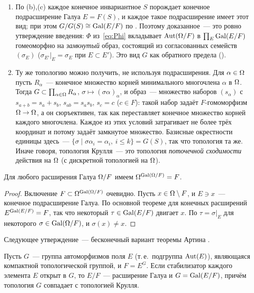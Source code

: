 \begin{remark}[7.8a]
\begin{enumerate}[label=(\alph*),leftmargin=*]
\item По (b),(c) каждое конечное инвариантное $S$ порождает конечное подрасширение Галуа $E=F(S)$, и каждое такое
подрасширение имеет этот вид; при этом $G/G(S)\cong\operatorname{Gal}(E/F)$ по . Поэтому доказанное~--- это ровно утверждение введения: $\Phi$
из~\eqref{eq:Phi} вкладывает $\operatorname{Aut}(\Omega/F)$ в $\prod_E\operatorname{Gal}(E/F)$ гомеоморфно на \emph{замкнутый} образ, состоящий из
согласованных семейств $(\sigma_E)$ ($\sigma_{E'}|_E=\sigma_E$ при $E\subset E'$). Это вид $G$ как обратного предела ().
\item Ту же топологию можно получить, не используя подрасширения. Для $\alpha\in\Omega$ пусть $R_\alpha$~--- конечное
множество корней минимального многочлена $\alpha$ в $\Omega$. Тогда $G\subset\prod_{\alpha\in\Omega}R_\alpha$,
$\sigma\mapsto(\sigma\alpha)_\alpha$, и образ~--- множество наборов $(s_\alpha)$ с $s_{a+b}=s_a+s_b$, $s_{ab}=s_as_b$,
$s_c=c$ ($c\in F$): такой набор задаёт $F$-гомоморфизм $\Omega\to\Omega$, а он сюръективен, так как переставляет конечное
множество корней каждого многочлена. Каждое из этих условий затрагивает не более трёх координат и потому задаёт
замкнутое множество. Базисные окрестности единицы здесь~--- $\{\sigma\mid\sigma\alpha_i=\alpha_i,\ i\le k\}=G(S)$, так что
топология та же. Иначе говоря, топология Крулля~--- это топология \emph{поточечной сходимости} действия на $\Omega$ (с
дискретной топологией на $\Omega$).
\end{enumerate}
\end{remark}

\begin{proposition}[7.9]
Для любого расширения Галуа $\Omega/F$ имеем $\Omega^{\operatorname{Gal}(\Omega/F)}=F$.
\end{proposition}

\begin{proof}
Включение $F\subset\Omega^{\operatorname{Gal}(\Omega/F)}$ очевидно. Пусть $x\in\Omega\setminus F$, и $E\ni x$~--- конечное подрасширение Галуа.
По основной теореме для конечных расширений $E^{\operatorname{Gal}(E/F)}=F$, так что некоторый $\tau\in\operatorname{Gal}(E/F)$ двигает $x$. По 
$\tau=\sigma|_E$ для некоторого $\sigma\in\operatorname{Gal}(\Omega/F)$, и $\sigma(x)\ne x$.
\end{proof}

Следующее утверждение~--- бесконечный вариант теоремы Артина .

\begin{proposition}[7.10]
Пусть $G$~--- группа автоморфизмов поля $E$ (т.\,е.\ подгруппа $\operatorname{Aut}(E)$), являющаяся компактной топологической
группой, и $F=E^G$. Если стабилизатор каждого элемента $E$ открыт в $G$, то $E/F$~--- расширение Галуа и
$G=\operatorname{Gal}(E/F)$, причём топология $G$ совпадает с топологией Крулля.
\end{proposition}

